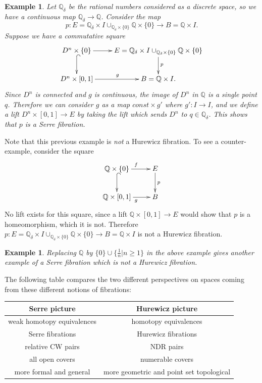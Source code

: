 \documentclass{article}
\newtheorem{example}[theorem]{Example}
\newtheorem{proposed work}[theorem]{Proposed Work}
\def\Q{\mathbb Q}\def\R{\mathbb R}
\newcommand{\xymat}[1]{\begin{align*}\xymatrix{ #1}\end{align*}}
\begin{document}
\begin{example}
Let $\mathbb{Q}_\delta$ be the rational numbers considered as a discrete space, so we have a continuous map $\mathbb{Q}_\delta\to \mathbb{Q}$. Consider the map 
$$p:E=\mathbb{Q}_\delta\times I\cup_{\mathbb{Q}_\delta\times \lbrace 0\rbrace} \mathbb{Q}\times \lbrace 0\rbrace \to B=\mathbb{Q}\times I.$$ 
Suppose we have a commutative square
\xymat{D^n\times \lbrace 0\rbrace \ar[r] \ar@{^{(}->}[d] & E=\mathbb{Q}_\delta\times I\cup_{\mathbb{Q}_\delta\times \lbrace 0\rbrace} \mathbb{Q}\times \lbrace 0\rbrace \ar[d]^p \\ D^n\times [0,1] \ar[r]^g & B=\mathbb{Q}\times I.}
Since $D^n$ is connected and $g$ is continuous, the image of $D^n$ in $\mathbb{Q}$ is a single point $q$. Therefore we can consider $g$ as a map $const \times g'$ where $g' : I\to I$, and we define a lift $D^n \times [0,1] \to E$ by taking the lift which sends $D^n$ to $q \in \mathbb{Q}_\delta$. This shows that $p$ is a Serre fibration. 
\end{example}
Note that this previous example is \textit{not} a Hurewicz fibration. To see a counter-example, consider the square
\xymat{\mathbb{Q}\times \lbrace 0\rbrace \ar[r]^f \ar@{^{(}->}[d] & E \ar[d]^p \\ \mathbb{Q}\times [0,1] \ar[r]_g & B}
No lift exists for this square, since a lift $\Q \times [0,1] \to E$ would show that $p$ is a homeomorphism, which it is not. Therefore  $p:E=\mathbb{Q}_\delta\times I\cup_{\mathbb{Q}_\delta\times \lbrace 0\rbrace} \mathbb{Q}\times \lbrace 0\rbrace \to B=\mathbb{Q}\times I$ is not a Hurewicz fibration.
\begin{example}
Replacing $\mathbb{Q}$ by $\lbrace 0 \rbrace \cup \lbrace \frac{1}{n}|n\geq 1\rbrace$ in the above example gives another example of a Serre fibration which is not a Hurewicz fibration. 
\end{example}
The following table compares the two different perspectives on spaces coming from these different notions of fibrations:\\

\begin{tabular}{|c|c|}
\hline 
\textbf{Serre picture} & \textbf{Hurewicz picture} \\ 
\hline 
weak homotopy equivalences & homotopy equivalences \\ 
\hline 
Serre fibrations & Hurewicz fibrations \\ 
\hline 
relative CW pairs & NDR pairs \\ 
\hline 
all open covers & numerable covers \\ 
\hline 
more formal and general & more geometric and point set topological \\ 
\hline 
\end{tabular} 
\end{document}
